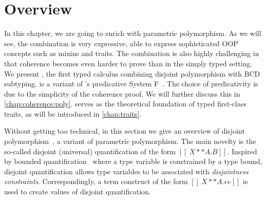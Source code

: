 
\section{Overview}

In this chapter, we are going to enrich \namee with parametric polymorphism. As
we will see, the combination is very expressive, able to express sophisticated
OOP concepts such as mixins and traits. The combination is also highly
challenging in that coherence becomes even harder to prove than in the simply
typed setting. We present \fnamee, the first typed calculus combining disjoint
polymorphism with BCD subtyping. \fnamee is a variant of
\citeauthor{leivant1991finitely}'s predicative System
F~\citep{leivant1991finitely}. The choice of predicativity is due to the
simplicity of the coherence proof. We will further discuss this in
\cref{chap:coherence:poly}. \fnamee serves as the theoretical foundation of
typed first-class traits, as will be introduced in \cref{chap:traits}.

Without getting too technical, in this section we give an overview of
disjoint polymorphism~\citep{alpuimdisjoint}, a variant of parametric polymorphism. The main novelty
is the so-called disjoint (universal) quantification of the form
$[[ \ X ** A . B ]]$. Inspired by bounded quantification~\citep{cardelli1994extension} where a
type variable is constrained by a type bound, disjoint quantification allows
type variables to be associated with \textit{disjointness constraints}. Correspondingly, a
term construct of the form $[[ \ X ** A. ee ]]$ is used to create values of
disjoint quantification.

